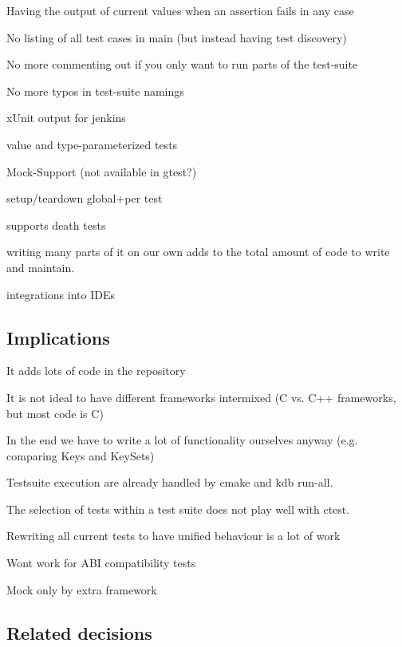 \begin{DoxyItemize}
\item Having the output of current values when an assertion fails in any case
\item No listing of all test cases in main (but instead having test discovery)
\item No more commenting out if you only want to run parts of the test-\/suite
\item No more typos in test-\/suite namings
\item x\+Unit output for jenkins
\item value and type-\/parameterized tests
\item Mock-\/\+Support (not available in gtest?)
\item setup/teardown global+per test
\item supports death tests
\item writing many parts of it on our own adds to the total amount of code to write and maintain.
\item integrations into I\+D\+Es
\end{DoxyItemize}

\subsection*{Implications}


\begin{DoxyItemize}
\item It adds lots of code in the repository
\item It is not ideal to have different frameworks intermixed (C vs. C++ frameworks, but most code is C)
\item In the end we have to write a lot of functionality ourselves anyway (e.\+g. comparing Keys and Key\+Sets)
\item Testsuite execution are already handled by cmake and kdb run-\/all.
\item The selection of tests within a test suite does not play well with ctest.
\item Rewriting all current tests to have unified behaviour is a lot of work
\item Wont work for A\+B\+I compatibility tests
\item Mock only by extra framework
\end{DoxyItemize}

\subsection*{Related decisions}


